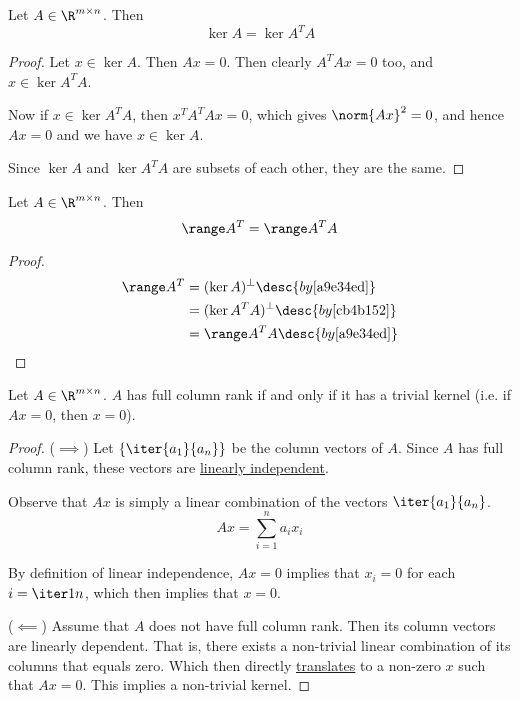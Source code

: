 \label{cb4b152}

Let $A\in\R^{m\times n}$. Then
$$
  \ker A=\ker A^TA
$$

\begin{proof}
  Let $x\in\ker A$. Then $Ax=0$. Then clearly $A^TAx=0$ too, and $x\in\ker
  A^TA$.

  Now if $x\in\ker A^TA$, then $x^TA^TAx=0$, which gives $\norm{Ax}^2=0$, and
  hence $Ax=0$ and we have $x\in\ker A$.

  Since $\ker A$ and $\ker A^TA$ are subsets of each other, they are the same.
\end{proof}

\label{a1227c1}

Let $A\in\R^{m\times n}$. Then
$$
  \range A^T=\range A^TA
$$

\begin{proof}
  \begin{align*}
    \range A^T &=(\ker A)^\perp\desc{by \autoref{a9e34ed}}    \\
               &=(\ker A^TA)^\perp\desc{by \autoref{cb4b152}} \\
               &=\range A^TA\desc{by \autoref{a9e34ed}}
  \end{align*}
\end{proof}

\label{a2a08ab}

Let $A\in\R^{m\times n}$. $A$ has full column rank if and only if it has a
trivial kernel (i.e. if $Ax=0$, then $x=0$).

\begin{proof}
  ($\implies$) Let $\{\iter{a_1}{a_n}\}$ be the column vectors of $A$. Since $A$
  has full column rank, these vectors are \href{c133a44}{linearly independent}.

  Observe that $Ax$ is simply a linear combination of the vectors
  $\iter{a_1}{a_n}$.
  $$
    Ax=\sum_{i=1}^na_ix_i
  $$

  By definition of linear independence, $Ax=0$ implies that $x_i=0$ for each
  $i=\iter1n$, which then implies that $x=0$.

  ($\impliedby$) Assume that $A$ does not have full column rank. Then its column
  vectors are linearly dependent. That is, there exists a non-trivial linear
  combination of its columns that equals zero. Which then directly
  \href{c3efdcc}{translates} to a non-zero $x$ such that $Ax=0$. This implies a
  non-trivial kernel.
\end{proof}

